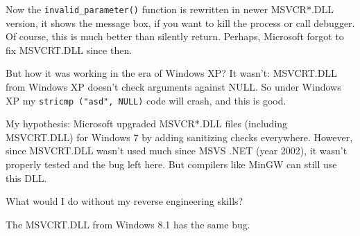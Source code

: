 Now the \verb|invalid_parameter()| function is rewritten in newer MSVCR*.DLL version,
it shows the message box, if you want to kill the process
or call debugger.
Of course, this is much better than silently return.
Perhaps, Microsoft forgot to fix MSVCRT.DLL since then.

But how it was working in the era of Windows XP? It wasn't: MSVCRT.DLL from Windows XP doesn't check arguments against NULL.
So under Windows XP my \verb|stricmp ("asd", NULL)| code will crash, and this is good.

My hypothesis: Microsoft upgraded MSVCR*.DLL files (including MSVCRT.DLL) for Windows 7 by adding sanitizing checks everywhere.
However, since MSVCRT.DLL wasn't used much since MSVS .NET (year 2002), it wasn't properly tested and the bug left here.
But compilers like MinGW can still use this DLL.

What would I do without my reverse engineering skills?

The MSVCRT.DLL from Windows 8.1 has the same bug.

